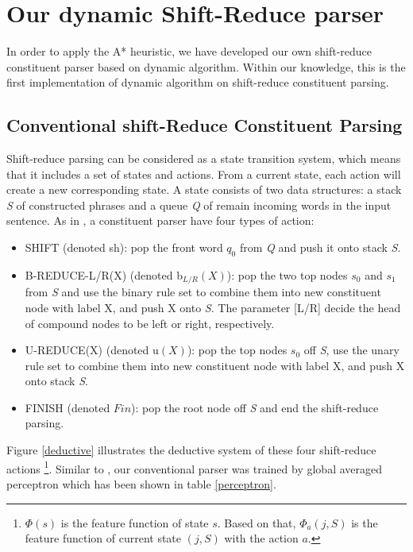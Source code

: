 \section {Our dynamic Shift-Reduce parser} 
In order to apply the A* heuristic, we have developed our own shift-reduce constituent parser based on dynamic algorithm. Within our knowledge, this is the first implementation of dynamic algorithm on shift-reduce constituent parsing.


\subsection{Conventional shift-Reduce Constituent Parsing}

Shift-reduce parsing can be considered as a state transition system, which means that it includes a set of states and actions. From a current state, each action will create a new corresponding state. A state consists of two data structures: a stack \textit{S} of constructed phrases and a queue \textit{Q} of remain incoming words in the input sentence. As in \cite{2009Zhang}, a constituent parser have four types of action:



\begin{itemize}
	\item SHIFT (denoted sh): pop the front word $q_0$ from \textit{Q} and push it onto stack \textit{S}.
	\item B-REDUCE-L/R(X) (denoted b$_{L/R}(X)$): pop the two top nodes $s_0$ and $s_1$ from \textit{S} and use the binary rule set to combine them into new constituent node with label X, and push X onto \textit{S}. The parameter [L/R] decide the head of compound nodes to be left or right, respectively.
	\item U-REDUCE(X) (denoted u$(X)$): pop the top nodes $s_0$ off \textit{S}, use the unary rule set to combine them into new constituent node with label X, and push X onto stack \textit{S}.
	\item FINISH (denoted $Fin$): pop the root node off \textit{S} and end the shift-reduce parsing. 
\end{itemize}
Figure \ref{deductive} illustrates the deductive system of these four shift-reduce actions \footnote{$\Phi(s)$ is the feature function of state $s$. Based on that, $\Phi_a(j,S)$ is the feature function of current state $(j,S)$ with the action $a$.}. Similar to \cite{2009Zhang}, our conventional parser was trained by global averaged perceptron which has been shown in table \ref{perceptron}.

